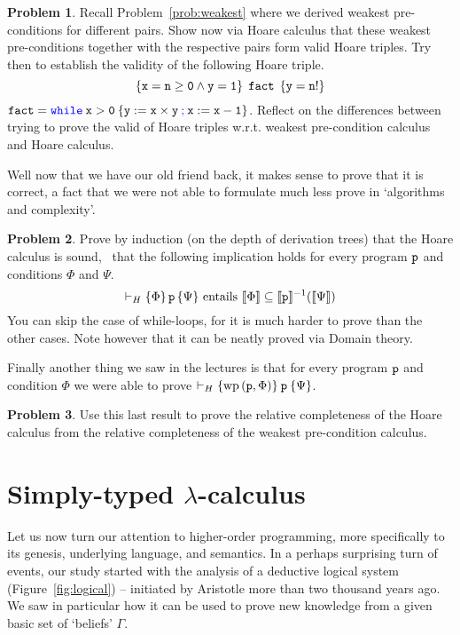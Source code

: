 \documentclass[a4paper, 11pt]{article}
\theoremstyle{definition}
\newtheorem{problem}{Problem}
\newcommand{\blue}[1]{\textcolor{blue}{#1}}
\begin{document}
\begin{problem}
        Recall Problem~\eqref{prob:weakest} where we derived weakest
        pre-conditions for different pairs. Show now via Hoare calculus that
        these weakest pre-conditions together with the respective pairs form
        valid Hoare triples.  Try then to establish the validity of the
        following Hoare triple.
        \[
                 \{ \mathtt{x = n \geq 0 \wedge y = 1} \} \> \> \mathtt{fact} \> \>
                \{ \mathtt{y = n!} \}
        \]
        ${\small \prog{fact} = \prog{\blue{while} \> x > 0 \> \{ y :=
        x \times y \> {\blue ;} \> x := x - 1 \} } }$.
        Reflect on the differences between trying to prove the valid of Hoare triples
        w.r.t. weakest pre-condition calculus and Hoare calculus.
\end{problem}

Well now that we have our old friend back, it makes sense to prove that it is
correct, a fact that we were not able to formulate much less prove in
`algorithms and complexity'.
\begin{problem}
        Prove by induction (on the depth of derivation trees) that the Hoare
        calculus is sound, \ie\ that the following implication holds for every
        program $\mathtt{p}$ and conditions $\Phi$ and $\Psi$.  \[
                \vdash_H \{ \Phi \} \, \mathtt{p} \, \{ \Psi \}
                \text{ entails }
                \llbracket \Phi \rrbracket \subseteq \llbracket \mathtt{p} \rrbracket^{-1}(\llbracket \Psi \rrbracket)
        \]
        You can skip the case of while-loops, for it is much harder to prove
        than the other cases. Note however that it can be neatly proved via
        Domain theory.
\end{problem}

Finally another thing we saw in the lectures is that for every program
$\mathtt{p}$ and condition $\Phi$ we were able to prove $\vdash_H \{ \mathrm{wp}
\, (\mathtt{p}, \Phi) \} \> \mathtt{p} \> \{ \Psi \}$.

\begin{problem}
        Use this last result to prove the relative completeness of the Hoare calculus
        from the relative completeness of the weakest pre-condition calculus.
\end{problem}

\section{Simply-typed $\lambda$-calculus}

Let us now turn our attention to higher-order programming, more specifically to
its genesis, underlying language, and semantics. In a perhaps surprising turn
of events, our study started with the analysis of a deductive logical system
(Figure~\ref{fig:logical}) -- initiated by Aristotle more than two thousand
years ago. We saw in particular how it can be used to prove new knowledge from
a given basic set of `beliefs' $\Gamma$.
\end{document}
